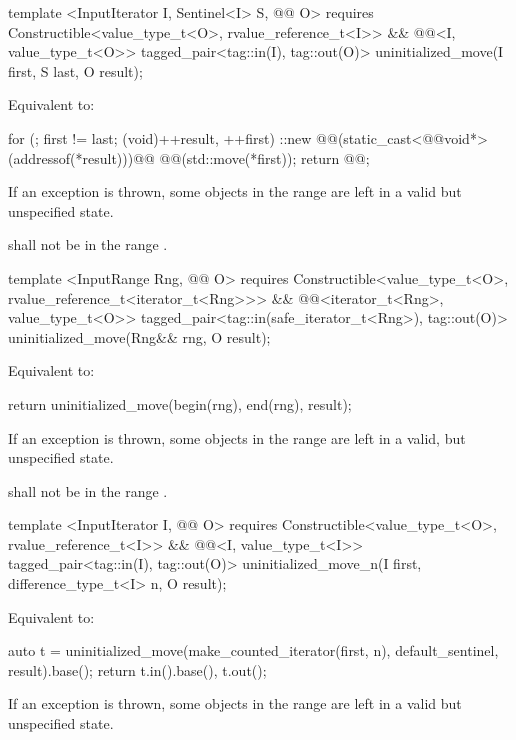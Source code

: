 {\color{addclr}
\begin{codeblock}
template <InputIterator I, Sentinel<I> S, @@ O>
requires
  Constructible<value_type_t<O>, rvalue_reference_t<I>> &&
  @@<I, value_type_t<O>>
tagged_pair<tag::in(I), tag::out(O)> uninitialized_move(I first, S last, O result);
\end{codeblock}
} %

\setcounter{Paras}{0}
\pnum
\effects Equivalent to:
\begin{codeblock}
    for (; first != last; (void)++result, ++first)
      ::new @@(static_cast<@@void*>(addressof(*result)))@\added{)}@
        @@(std::move(*first));
    return @@;
\end{codeblock}

\pnum
\remarks If an exception is thrown, some objects in the range  are left in a valid but
unspecified state.

{\color{addclr}
\pnum
\requires {} shall not be in the range .

\begin{codeblock}
template <InputRange Rng, @@ O>
requires
  Constructible<value_type_t<O>, rvalue_reference_t<iterator_t<Rng>>> &&
  @@<iterator_t<Rng>, value_type_t<O>>
tagged_pair<tag::in(safe_iterator_t<Rng>), tag::out(O)>
uninitialized_move(Rng&& rng, O result);
\end{codeblock}

\pnum
\effects Equivalent to:
\begin{codeblock}
    return uninitialized_move(begin(rng), end(rng), result);
\end{codeblock}

\pnum
\remarks If an exception is thrown, some objects in the range  are left in a valid, but
unspecified state.

\pnum
\requires {} shall not be in the range .

\begin{codeblock}
template <InputIterator I, @@ O>
requires
  Constructible<value_type_t<O>, rvalue_reference_t<I>> &&
  @@<I, value_type_t<I>>
tagged_pair<tag::in(I), tag::out(O)> uninitialized_move_n(I first, difference_type_t<I> n, O result);
\end{codeblock}

\pnum
\effects Equivalent to:
\begin{codeblock}
    auto t = uninitialized_move(make_counted_iterator(first, n),
                                default_sentinel{}, result).base();
    return {t.in().base(), t.out()};
\end{codeblock}

\pnum
} %
\remarks If an exception is thrown, some objects in the range 
are left in a valid\added{,} but unspecified state.

